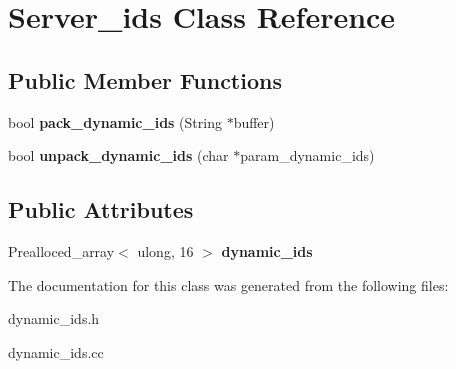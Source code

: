 \hypertarget{classServer__ids}{}\section{Server\+\_\+ids Class Reference}
\label{classServer__ids}
\subsection*{Public Member Functions}
\begin{DoxyCompactItemize}
\item 
\mbox{\label{classServer__ids_a311a7943d8dfeb4602388c1b37c5243f}} 
bool {\bfseries pack\+\_\+dynamic\+\_\+ids} (String $\ast$buffer)
\item 
\mbox{\label{classServer__ids_a8e2f68509431da4ef74a272d9f835572}} 
bool {\bfseries unpack\+\_\+dynamic\+\_\+ids} (char $\ast$param\+\_\+dynamic\+\_\+ids)
\end{DoxyCompactItemize}
\subsection*{Public Attributes}
\begin{DoxyCompactItemize}
\item 
\mbox{\label{classServer__ids_a53bc4d373e637307e9e1fcf643ae09a7}} 
Prealloced\+\_\+array$<$ ulong, 16 $>$ {\bfseries dynamic\+\_\+ids}
\end{DoxyCompactItemize}


The documentation for this class was generated from the following files\+:\begin{DoxyCompactItemize}
\item 
dynamic\+\_\+ids.\+h\item 
dynamic\+\_\+ids.\+cc\end{DoxyCompactItemize}
